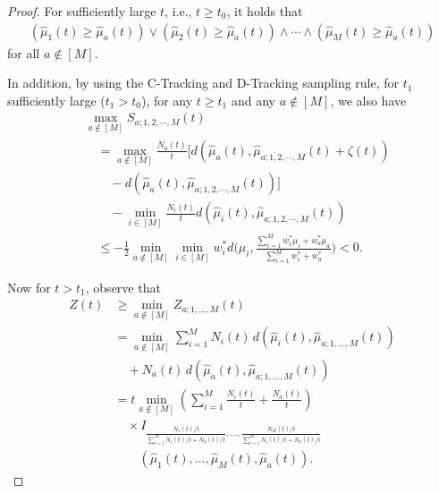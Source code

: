 \documentclass[final]{IEEEtran}
\newcommand{\nn}{\nonumber}
\begin{document}
\begin{proof}
For sufficiently large $ t$, i.e., $t \geq t_0$, it holds that
\begin{align}
(\hat{\mu}_1(t) \geq \hat{\mu}_a(t)) \vee (\hat{\mu}_2(t) \geq \hat{\mu}_a(t)) \wedge \cdots \wedge (\hat{\mu}_M(t) \geq \hat{\mu}_a(t))
\end{align}
for all $ a \notin [M]$.

In addition, by using the C-Tracking and D-Tracking sampling rule, for $t_1$ sufficiently large ($t_1>t_0$), for any $t\geq t_1$ and any $a \notin [M]$, we also have
\begin{align}
&\max_{a \notin [M]} S_{a;1,2,\cdots,M}(t) \nn \\
&\quad =\max_{a \notin [M]} \frac{N_a(t)}{t} \big[d(\hat{\mu}_a(t),\hat{\mu}_{a;1,2,\cdots,M}(t)+\zeta(t))\nn\\
&\qquad - d(\hat{\mu}_a(t),\hat{\mu}_{a;1,2,\cdots,M}(t))\big]\nn\\
&\qquad -\min_{i \in [M]} \frac{N_i(t)}{t} d(\hat{\mu}_i(t),\hat{\mu}_{a;1,2,\cdots,M}(t)) \nn \\
&\quad  \leq -\frac{1}{2}\min_{a \notin [M]} \min_{i \in [M]}  w_i^* d\bigg(\mu_i, \frac{\sum_{i=1}^M w_i^* \mu_i +w_a^* \mu_a}{\sum_{i=1}^M w_i^*+ w_a^*}\bigg)<0. 
\end{align}

Now for $t>t_1$, observe that
\begin{align}
Z(t) &\geq \min_{a \notin [M]} Z_{a;1,\ldots,M}(t) \nn \\
&= \min_{a \notin [M]} \sum_{i=1}^M N_i(t)\, d\left(\hat{\mu}_i(t), \hat{\mu}_{a;1,\ldots,M}(t)\right) \nn\\
&\quad + N_a(t)\, d\left(\hat{\mu}_a(t), \hat{\mu}_{a;1,\ldots,M}(t)\right) \nn \\
&= t  \min_{a \notin [M]} \left( \sum_{i=1}^M \frac{N_i(t)}{t} + \frac{N_a(t)}{t} \right) \nn \\
&\quad \times  I_{\frac{N_1(t)/t}{\sum_{i=1}^M N_i(t)/t + N_a(t)/t}, \ldots, \frac{N_M(t)/t}{\sum_{i=1}^M N_i(t)/t + N_a(t)/t}} \nn\\
&\qquad \left( \hat{\mu}_1(t), \ldots, \hat{\mu}_M(t), \hat{\mu}_a(t) \right).
\end{align}


\end{proof}
\end{document}
